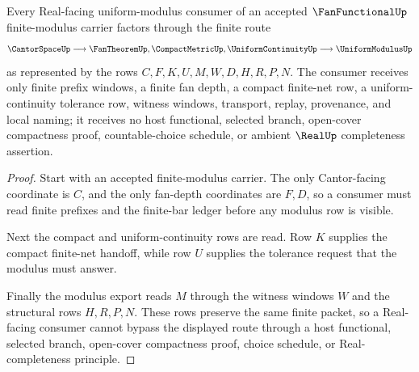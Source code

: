\begin{theorem}
\label{thm:fan-functional-real-uniform-modulus-handoff}
Every Real-facing uniform-modulus consumer of an accepted $\FanFunctionalUp$ finite-modulus carrier factors through the finite route
$$
\CantorSpaceUp \longrightarrow \FanTheoremUp,\CompactMetricUp,\UniformContinuityUp \longrightarrow \UniformModulusUp
$$
as represented by the rows $C,F,K,U,M,W,D,H,R,P,N$. The consumer receives only finite prefix windows, a finite fan depth, a compact finite-net row, a uniform-continuity tolerance row, witness windows, transport, replay, provenance, and local naming; it receives no host functional, selected branch, open-cover compactness proof, countable-choice schedule, or ambient $\RealUp$ completeness assertion.
\end{theorem}
\begin{proof}
Start with an accepted finite-modulus carrier. The only Cantor-facing coordinate is $C$, and the only fan-depth coordinates are $F,D$, so a consumer must read finite prefixes and the finite-bar ledger before any modulus row is visible.

Next the compact and uniform-continuity rows are read. Row $K$ supplies the compact finite-net handoff, while row $U$ supplies the tolerance request that the modulus must answer.

Finally the modulus export reads $M$ through the witness windows $W$ and the structural rows $H,R,P,N$. These rows preserve the same finite packet, so a Real-facing consumer cannot bypass the displayed route through a host functional, selected branch, open-cover compactness proof, choice schedule, or Real-completeness principle.
\end{proof}

